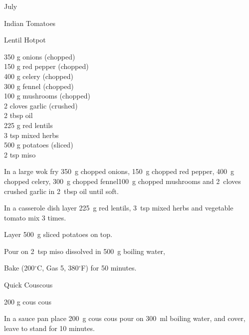 \begin{menu}{July}
\begin{recipe}{2}{Indian Tomatoes}
\begin{instructions}
    \end{instructions}
    \end{recipe}%
  
    \begin{recipe}{2}{Lentil Hotpot}%
		\begin{ingredients}
		350 g onions (chopped) \\
	150 g red pepper (chopped) \\
	400 g celery (chopped) \\
	300 g fennel (chopped) \\
	100 g mushrooms (chopped) \\
	2 cloves garlic (crushed) \\
	2 tbsp oil  \\
	225 g red lentils  \\
	3 tsp mixed herbs  \\
	500 g potatoes (sliced) \\
	2 tsp miso  \\
	
		\end{ingredients}
	
    \begin{instructions}
    \item 
        In a large wok fry
        350~g chopped onions,
        150~g chopped red pepper,
        400~g chopped celery,
        300~g chopped fennel100~g chopped mushrooms
        and
        2~cloves crushed garlic
        in
        2~tbsp  oil
        until soft.
      \item 
        In a casserole dish layer
        225~g  red lentils,
        3~tsp  mixed herbs
        and vegetable tomato mix 3 times.
      \item 
        Layer 500~g sliced potatoes on top.
      \item 
        Pour on
        2~tsp  miso
        dissolved in
        500~g  boiling water,
      \item 	Bake (200$^{\circ}$C, Gas 5, 380$^{\circ}$F) for 50 minutes.
    \end{instructions}
    \end{recipe}%
  
    \begin{recipe}{1}{Quick Couscous}%
		\begin{ingredients}
		200 g cous cous  \\
	
		\end{ingredients}
	
    \begin{instructions}
    \item 
      In a
      sauce pan 
      place
      200~g  cous cous
      pour on
      300~ml  boiling water,
      and cover, leave to stand for 10 minutes.
    
    \end{instructions}
    \end{recipe}%
  
    \clearpage
    \end{menu}
	
